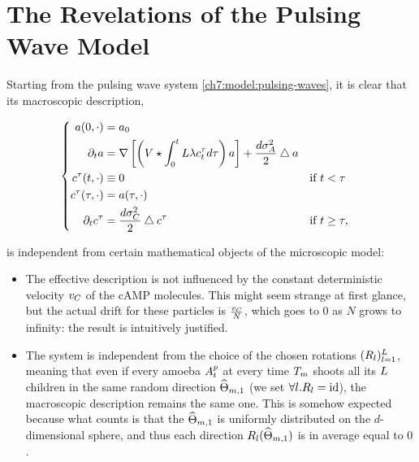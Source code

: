 \label{ch:conc}

\section{The Revelations of the Pulsing Wave Model}

Starting from the pulsing wave system \ref{ch7:model:pulsing-waves}, it is clear that its macroscopic description, \ie

\begin{equation*}
	\left\{
	\begin{aligned}
		a(0, \cdot) &= a_0
		\\
		\partial_t a &= \nabla \left[ \left( V
		\star \int_0^t L\lambda c_t^\tau 	d \tau
		\right)
		a
		\right]
		+ \frac{d\sigma_A^2}{2} \bigtriangleup a	
		\\
		c^\tau(t, \cdot) 
		& \equiv 0
		&&\text{if } t < \tau
		\\
		c^\tau(\tau, \cdot) 
		&= a(\tau, \cdot)
		&&
		\\
		\partial_t c^\tau
		&= \frac{d\sigma_C^2}{2} \bigtriangleup c^\tau
		&&\text{if } t \geq \tau,
	\end{aligned}
	\right.
\end{equation*}

is independent from certain mathematical objects of the microscopic model:

\begin{itemize}
	\item The effective description is not influenced by the constant deterministic velocity $v_C$ of the cAMP molecules.
	This might seem strange at first glance, but the actual drift for these particles is $\frac{v_C}{N}$, which goes to $0$ as $N$ grows to infinity: the result is intuitively justified.
	\item The system is independent from the choice of the chosen rotations $(R_l)_{l=1}^L$, meaning that even if every amoeba $A_t^p$ at every time $T_m$ shoots all its $L$ children in the same random direction $\widehat{\Theta}_{m,1}$ (\ie we set $\forall l. R_l = \text{id}$), the macroscopic description remains the same one.
	This is somehow expected because what counts is that the \rv $\widehat{\Theta}_{m,1}$ is uniformly distributed on the $d$-dimensional sphere, and thus each direction $R_l(\widehat{\Theta}_{m,1})$ is in average equal to $0$.
\end{itemize}

